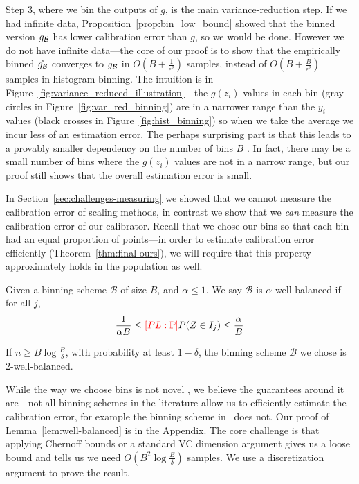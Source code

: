 Step 3, where we bin the outputs of $g$, is the main variance-reduction step. If we had infinite data, Proposition~\ref{prop:bin_low_bound} showed that the binned version $g_{\mathcal{B}{}}$ has lower calibration error than $g$, so we would be done. However we do not have infinite data---the core of our proof is to show that the empirically binned $\hat{g_{\mathcal{B}{}}}$ converges to $g_{\mathcal{B}{}}$ in $O(B + \frac{1}{\epsilon^2})$ samples, instead of $O(B + \frac{B}{\epsilon^2})$ samples in histogram binning. The intuition is in Figure~\ref{fig:variance_reduced_illustration}---the $g(z_i)$ values in each bin (gray circles in Figure~\ref{fig:var_red_binning}) are in a narrower range than the $y_i$ values (black crosses in Figure~\ref{fig:hist_binning}) so when we take the average\pl{,} we incur less of an estimation error. The perhaps surprising part is that this leads to a provably smaller dependency on the number of bins $B$ . In fact, there may be a small number of bins where the $g(z_i)$ values are not in a narrow range, but our proof still shows that the overall estimation error is small.

In Section~\ref{sec:challenges-measuring} we showed that we cannot measure the calibration error of scaling methods, in contrast we show that we \emph{can} measure the calibration error of our calibrator. Recall that we chose our bins so that each bin had an equal proportion of points---in order to estimate calibration error efficiently (Theorem~\ref{thm:final-ours}), we will require that this property approximately holds in the population as well.

\begin{definition}
Given a binning scheme $\mathcal{B}$ of size $B$, and $\alpha \leq 1$. We say $\mathcal{B}$ is $\alpha$-well-balanced if for all $j$,
  \[ \frac{1}{\alpha B} \leq \textcolor{red}{[PL: \mathbb P]} P(Z \in I_j) \leq \frac{\alpha}{B}\]
\end{definition}

\begin{lemma}
\label{lem:well-balanced}
If $n \geq B\log{\frac{B}{\delta}}$, with probability at least $1 - \delta$, the binning scheme $\mathcal{B}$ we chose is 2-well-balanced.
\end{lemma}

While the way we choose bins is not novel , we believe the guarantees around it are---not all binning schemes in the literature allow us to efficiently estimate the calibration error, for example the binning scheme in~\cite{guo2017calibration} does not. Our proof of Lemma~\ref{lem:well-balanced} is in the Appendix. The core challenge is that applying Chernoff bounds or  a standard VC dimension argument gives us a loose bound and tells us we need $O(B^2\log{\frac{B}{\delta}})$ samples. We use a discretization argument to prove the result.

